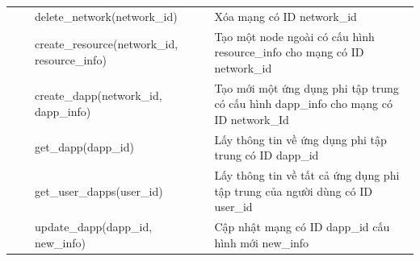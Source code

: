 \documentclass[../DoAn.tex]{subfiles}
\begin{document}
\begin{longtable}{|p{}|p{}|p{}|p{}|}
                                                 &                                                                                  & \hspace{0pt}delete\_network\hspace{0pt}(network\_id)                              & Xóa mạng có ID network\_id                                                                   \\ \cline{3-4}
                                                 &                                                                                  & \hspace{0pt}create\_resource\hspace{0pt}(network\_id, resource\_info)             & Tạo một node ngoài có cấu hình resource\_info cho mạng có ID network\_id                     \\ \cline{3-4}
                                                 &                                                                                  & \hspace{0pt}create\_dapp\hspace{0pt}(network\_id, dapp\_info)                     & Tạo mới một ứng dụng phi tập trung có cấu hình dapp\_info cho mạng có ID network\_Id         \\ \cline{3-4}
                                                 &                                                                                  & \hspace{0pt}get\_dapp\hspace{0pt}(dapp\_id)                                       & Lấy thông tin về ứng dụng phi tập trung có ID dapp\_id                                       \\ \cline{3-4}
                                                 &                                                                                  & \hspace{0pt}get\_user\_dapps\hspace{0pt}(user\_id)                                & Lấy thông tin về tất cả ứng dụng phi tập trung của người dùng có ID user\_id                 \\ \cline{3-4}
                                                 &                                                                                  & \hspace{0pt}update\_dapp\hspace{0pt}(dapp\_id, new\_info)                         & Cập nhật mạng có ID dapp\_id cấu hình mới new\_info                                          \\ \cline{3-4}

\end{longtable}
\end{document}
